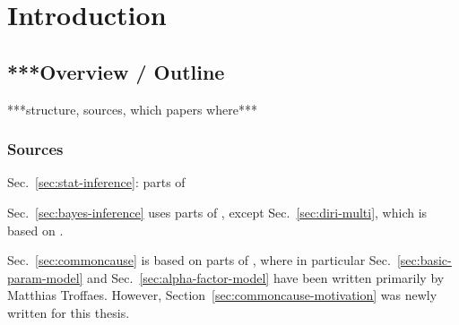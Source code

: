 \chapter{Introduction}
\label{cha:intro}


\section{***Overview / Outline}


***structure, sources, which papers where***


\subsection{Sources}

Sec.~\ref{sec:stat-inference}: parts of \textcite[\S\S 1.1, 1.2, 1.5]{itip-statinf}

Sec.~\ref{sec:bayes-inference} uses parts of \textcite[\S\S 1.3, 1.4, 4.1]{itip-statinf},
except Sec.~\ref{sec:diri-multi}, which is based on \textcite{Walter2012b}.



Sec.~\ref{sec:commoncause} is based on parts of \textcite{Troffaes2013a},
where in particular Sec.~\ref{sec:basic-param-model} and Sec.~\ref{sec:alpha-factor-model}
have been written primarily by Matthias Troffaes.
However, Section~\ref{sec:commoncause-motivation} was newly written for this thesis.

